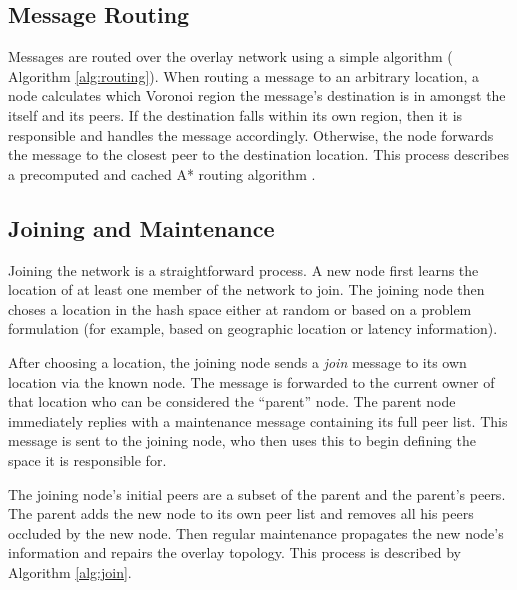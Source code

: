 \subsection{Message Routing}
Messages are routed over the overlay network using a simple algorithm ( Algorithm \ref{alg:routing}). 
When routing a message to an arbitrary location, a node calculates which Voronoi region the message's destination is in amongst the itself and its peers. If the destination falls within its own region, then it is responsible and handles the message accordingly. Otherwise, the node forwards the message to the closest peer to the destination location. This process describes a precomputed and cached A* routing  algorithm \cite{astar} . 


\subsection{Joining and Maintenance}
Joining the network is a straightforward process. A new node first learns the location of at least one member of the network to join. The joining node then choses a location in the hash space either at random or based on a problem formulation (for example, based on geographic location or latency information).

After choosing a location, the joining node sends a \textit{join} message to its own location via the known node.
The message is forwarded to the current owner of that location who can be considered the ``parent'' node.
The parent node immediately replies with a maintenance message containing its full peer list. 
This message is sent to the joining node, who then uses this to begin defining the space it is responsible for. 

The joining node's initial peers are a subset of the parent and the parent's peers. The parent adds the new node to its own peer list and removes all his peers occluded by the new node.  Then regular maintenance propagates the new node's information and repairs the overlay topology.  This process is described by Algorithm \ref{alg:join}.


